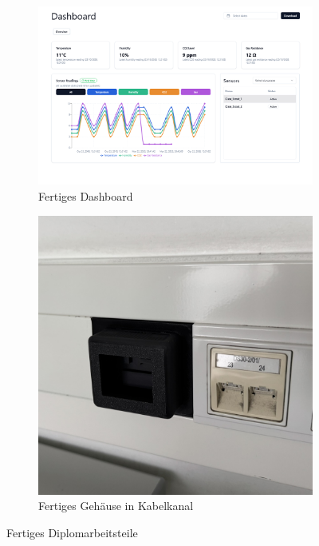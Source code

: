 \begin{inhalt}
\begin{figure}[!htb]
    \centering
    \begin{subfigure}[b]{0.49\textwidth}
        \includegraphics[width=\textwidth]{files/Thomas/pics/Website/dashbord/dashbaord-screen.png}
        \caption{Fertiges Dashboard}
        \label{fig:dashboard_fertig}
    \end{subfigure}
    \hfill
    \begin{subfigure}[b]{0.49\textwidth}
        \includegraphics[width=\textwidth]{files/Thomas/pics/image.png}
        \caption{Fertiges Gehäuse in Kabelkanal}
        \label{fig:dashboard_zweites}
    \end{subfigure}
    \caption[Fertige Diplomarbeitsteile]{Fertiges Diplomarbeitsteile}
    \label{fig:dashboard_vergleich}
\end{figure}



\end{inhalt}
